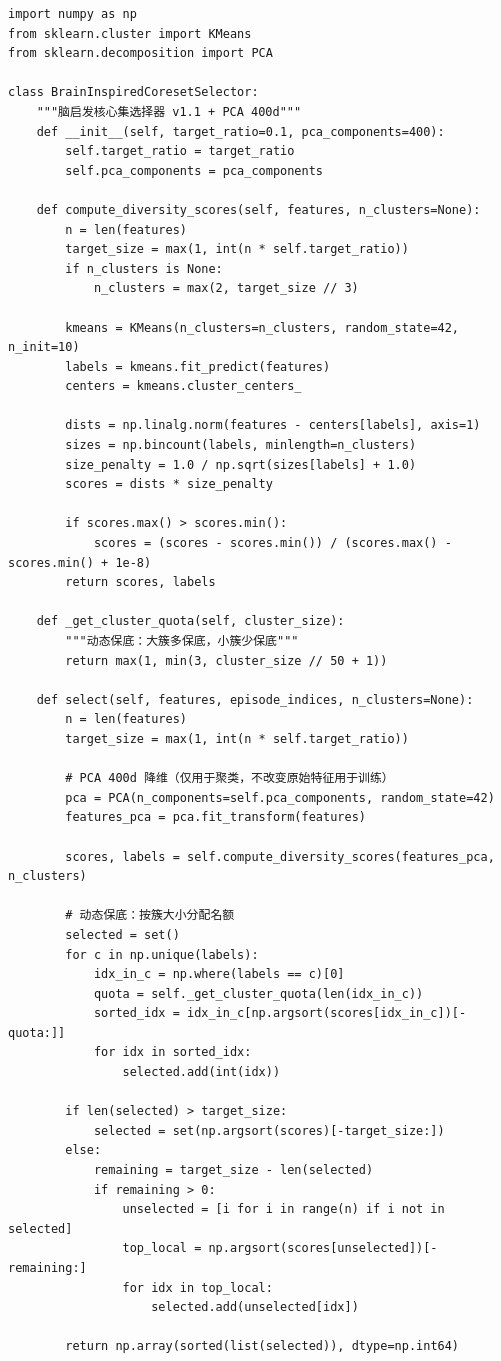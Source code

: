 \documentclass[12pt,a4paper]{article}
\begin{document}
\begin{verbatim}
import numpy as np
from sklearn.cluster import KMeans
from sklearn.decomposition import PCA

class BrainInspiredCoresetSelector:
    """脑启发核心集选择器 v1.1 + PCA 400d"""
    def __init__(self, target_ratio=0.1, pca_components=400):
        self.target_ratio = target_ratio
        self.pca_components = pca_components
    
    def compute_diversity_scores(self, features, n_clusters=None):
        n = len(features)
        target_size = max(1, int(n * self.target_ratio))
        if n_clusters is None:
            n_clusters = max(2, target_size // 3)
        
        kmeans = KMeans(n_clusters=n_clusters, random_state=42, n_init=10)
        labels = kmeans.fit_predict(features)
        centers = kmeans.cluster_centers_
        
        dists = np.linalg.norm(features - centers[labels], axis=1)
        sizes = np.bincount(labels, minlength=n_clusters)
        size_penalty = 1.0 / np.sqrt(sizes[labels] + 1.0)
        scores = dists * size_penalty
        
        if scores.max() > scores.min():
            scores = (scores - scores.min()) / (scores.max() - scores.min() + 1e-8)
        return scores, labels
    
    def _get_cluster_quota(self, cluster_size):
        """动态保底：大簇多保底，小簇少保底"""
        return max(1, min(3, cluster_size // 50 + 1))
    
    def select(self, features, episode_indices, n_clusters=None):
        n = len(features)
        target_size = max(1, int(n * self.target_ratio))
        
        # PCA 400d 降维（仅用于聚类，不改变原始特征用于训练）
        pca = PCA(n_components=self.pca_components, random_state=42)
        features_pca = pca.fit_transform(features)
        
        scores, labels = self.compute_diversity_scores(features_pca, n_clusters)
        
        # 动态保底：按簇大小分配名额
        selected = set()
        for c in np.unique(labels):
            idx_in_c = np.where(labels == c)[0]
            quota = self._get_cluster_quota(len(idx_in_c))
            sorted_idx = idx_in_c[np.argsort(scores[idx_in_c])[-quota:]]
            for idx in sorted_idx:
                selected.add(int(idx))
        
        if len(selected) > target_size:
            selected = set(np.argsort(scores)[-target_size:])
        else:
            remaining = target_size - len(selected)
            if remaining > 0:
                unselected = [i for i in range(n) if i not in selected]
                top_local = np.argsort(scores[unselected])[-remaining:]
                for idx in top_local:
                    selected.add(unselected[idx])
        
        return np.array(sorted(list(selected)), dtype=np.int64)
\end{verbatim}
\end{document}
